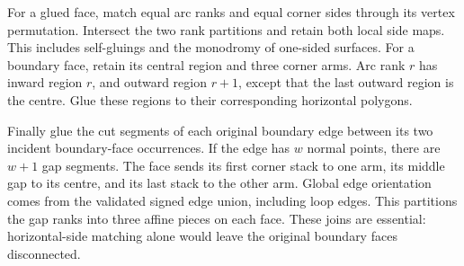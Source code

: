 For a glued face, match equal arc ranks and equal corner sides through its
vertex permutation. Intersect the two rank partitions and retain both local
side maps. This includes self-gluings and the monodromy of one-sided surfaces.
For a boundary face, retain its central region and three corner arms. Arc
rank $r$ has inward region $r$, and outward region $r+1$, except that the
last outward region is the centre. Glue these regions to their corresponding
horizontal polygons.

Finally glue the cut segments of each original boundary edge between its
two incident boundary-face occurrences. If the edge has $w$ normal points,
there are $w+1$ gap segments. The face sends its first corner stack to one
arm, its middle gap to its centre, and its last stack to the other arm.
Global edge orientation comes from the validated signed edge union, including
loop edges. This partitions the gap ranks into three affine pieces on each
face. These joins are essential: horizontal-side matching alone would leave
the original boundary faces disconnected.

